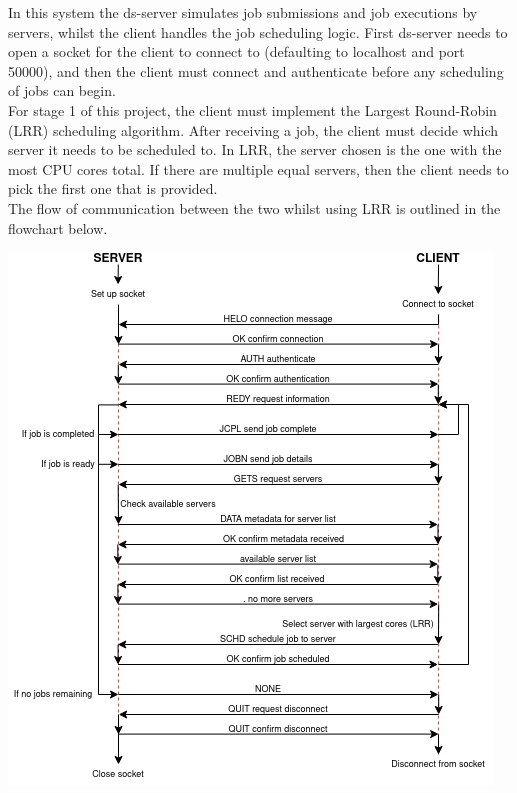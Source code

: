 In this system the ds-server simulates job submissions and job executions by servers, whilst the client handles the job scheduling logic. First ds-server needs to open a socket for the client to connect to (defaulting to localhost and port 50000), and then the client must connect and authenticate before any scheduling of jobs can begin.\\

\vspace{.2cm}
For stage 1 of this project, the client must implement the Largest Round-Robin (LRR) scheduling algorithm. After receiving a job, the client must decide which server it needs to be scheduled to. In LRR, the server chosen is the one with the most CPU cores total. If there are multiple equal servers, then the client needs to pick the first one that is provided. \\

\vspace{.2cm}
The flow of communication between the two whilst using LRR is outlined in the flowchart below.
\begin{center}
    \includegraphics[scale=0.7]{Communication Flowchart.png}
\end{center}

